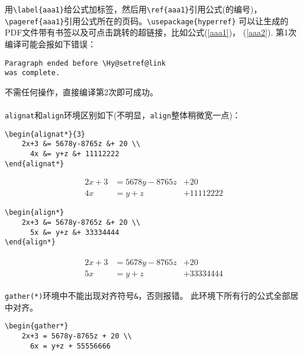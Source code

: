 \documentclass[fontset=windows]{article}
\begin{document}
\begin{multicols}{2}
\begin{enumerate}
用\verb|\label{aaa1}|给公式加标签，然后用\verb|\ref{aaa1}|引用公式(的编号)，
\verb|\pageref{aaa1}|引用公式所在的页码。\verb|\usepackage{hyperref}|
可以让生成的PDF文件带有书签以及可点击跳转的超链接，比如公式(\ref{aaa1})，
(\ref{aaa2}). 第1次编译可能会报如下错误：
\begin{lstlisting}
Paragraph ended before \Hy@setref@link 
was complete.
\end{lstlisting} 
不需任何操作，直接编译第2次即可成功。\\
\\
\verb|alignat|和\verb|align|环境区别如下(不明显，\verb|align|整体稍微宽一点)：
\begin{lstlisting}
\begin{alignat*}{3}
    2x+3 &= 5678y-8765z &+ 20 \\
      4x &= y+z &+ 11112222 
\end{alignat*}    
\end{lstlisting} 
\begin{tcolorbox}
    \vspace{-5mm}
\begin{alignat*}{3}   
    2x+3 &= 5678y-8765z &+ 20 \\
    4x &= y+z &+ 11112222  
\end{alignat*} 
\end{tcolorbox}
\begin{lstlisting}
\begin{align*}
    2x+3 &= 5678y-8765z &+ 20 \\
      5x &= y+z &+ 33334444 
\end{align*}    
\end{lstlisting} 
\begin{tcolorbox}
    \vspace{-3mm}
\begin{align*}
    \begin{aligned}
      2x+3 &= 5678y-8765z &+ 20 \\
        5x &= y+z &+ 33334444 
    \end{aligned} 
\end{align*}
\end{tcolorbox}
\verb|gather(*)|环境中不能出现对齐符号\verb|&|，否则报错。
此环境下所有行的公式全部居中对齐。
\begin{lstlisting}
\begin{gather*}
    2x+3 = 5678y-8765z + 20 \\
      6x = y+z + 55556666 

\end{lstlisting}
\end{enumerate}
\end{multicols}
\end{document}
